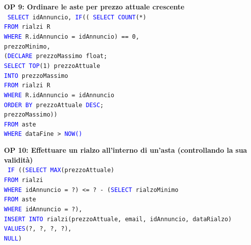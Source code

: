 \documentclass[a4paper,12pt]{report}
\begin{document}
            \noindent
            \textbf{OP 9: Ordinare le aste per prezzo attuale crescente} \\
            \texttt{
                \textcolor{blue}{SELECT} idAnnuncio, \textcolor{blue}{IF}(( \textcolor{blue}{SELECT COUNT}(*) \\
                    \null\qquad\qquad\qquad\qquad\qquad\qquad \textcolor{blue}{FROM} rialzi R \\
                    \null\qquad\qquad\qquad\qquad\qquad\qquad \textcolor{blue}{WHERE} R.idAnnuncio = idAnnuncio) == 0, \\
                    \null\qquad\qquad\qquad\qquad\qquad\qquad prezzoMinimo, \\
                    \null\qquad\qquad\qquad\qquad\qquad\qquad (\textcolor{blue}{DECLARE} prezzoMassimo float; \\
                    \null\qquad\qquad\qquad\qquad\qquad\qquad \textcolor{blue}{SELECT TOP}(1) prezzoAttuale \\
                    \null\qquad\qquad\qquad\qquad\qquad\qquad \textcolor{blue}{INTO} prezzoMassimo \\
                    \null\qquad\qquad\qquad\qquad\qquad\qquad \textcolor{blue}{FROM} rialzi R \\
                    \null\qquad\qquad\qquad\qquad\qquad\qquad \textcolor{blue}{WHERE} R.idAnnuncio = idAnnuncio \\
                    \null\qquad\qquad\qquad\qquad\qquad\qquad \textcolor{blue}{ORDER BY} prezzoAttuale \textcolor{blue}{DESC}; \\
                    \null\qquad\qquad\qquad\qquad\qquad\qquad prezzoMassimo)) \\
                \textcolor{blue}{FROM} aste \\
                \textcolor{blue}{WHERE} dataFine > \textcolor{blue}{NOW()} \\
            }

            \noindent
            \textbf{OP 10: Effettuare un rialzo all’interno di un’asta (controllando la sua validità)} \\
            \texttt{
                \textcolor{blue}{IF} ((\textcolor{blue}{SELECT MAX}(prezzoAttuale) \\
                    \null\qquad \textcolor{blue}{FROM} rialzi \\
                    \null\qquad \textcolor{blue}{WHERE} idAnnuncio = ?) <= ? - (\textcolor{blue}{SELECT} rialzoMinimo \\
                        \null\qquad\qquad\qquad\qquad\qquad\qquad\qquad\qquad\qquad \textcolor{blue}{FROM} aste \\
                        \null\qquad\qquad\qquad\qquad\qquad\qquad\qquad\qquad\qquad \textcolor{blue}{WHERE} idAnnuncio = ?), \\
                    \null\qquad \textcolor{blue}{INSERT INTO} rialzi(prezzoAttuale, email, idAnnuncio, dataRialzo) \\
                    \null\qquad \textcolor{blue}{VALUES}(?, ?, ?, ?), \\ 
                    \null\qquad \textcolor{blue}{NULL}) \\
            }       
            
\end{document}
